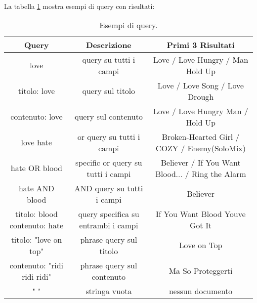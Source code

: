 \documentclass[12pt, letterpaper]{article}
\begin{document}
\begin{center}
    La tabella \ref{table:data} mostra esempi di query con risultati:
\end{center}
\begin{table}[h!]
\centering
\begin{tabular}{||c c c |} 
 \hline
\textbf{Query} & \textbf{Descrizione} & \textbf{Primi 3 Risultati}\\[1ex]
 \hline\hline
 love & query su tutti i campi & Love / Love Hungry / Man Hold Up\\ 
 titolo: love & query sul titolo & Love / Love Song / Love Drough\\
 contenuto: love & query sul contenuto & Love / Love Hungry Man / Hold Up\\
    love hate & or query su tutti i campi & Broken-Hearted Girl / COZY / Enemy(SoloMix)  \\
 hate OR blood & specific or query su tutti i campi & Believer / If You Want Blood...  / Ring the Alarm  \\
 hate AND blood & AND query su tutti i campi & Believer\\
 titolo: blood contenuto: hate & query specifica su entrambi i campi & If You Want Blood  Youve Got It  \\
 titolo: "love on top" & phrase query sul titolo & Love on Top\\
 contenuto: "ridi ridi ridi" & phrase query sul contenuto & Ma So Proteggerti\\
 " " & stringa vuota & nessun documento \\
 \hline
\end{tabular}
\caption{Esempi di query.}
\label{table:data}
\end{table}
\end{document}
